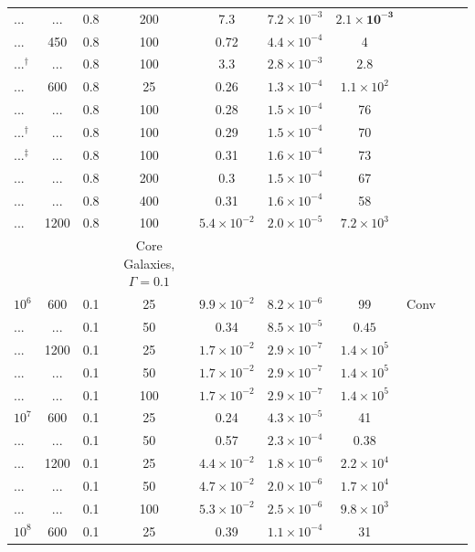 \documentclass[usenatbib,fleqn]{mn2e}
\begin{document}
\begin{table}
\begin{threeparttable}
\begin{minipage}{18cm}
\begin{tabular}{lccccccccc}
... & ... & 0.8 & 200 & 7.3 & $ 7.2 \times 10^{ -3 }$ & $\mathbf{ 2.1
  \times 10^{ -3 }}$ \\
... & 450 & 0.8 & 100 & 0.72 & $ 4.4 \times 10^{ -4 }$ & 4 \\
...$^{\dagger}$ & ... & 0.8 & 100 & 3.3 & $ 2.8 \times 10^{ -3 }$ & $\mathbf{2.8}$\\
... & 600 & 0.8 & 25 & 0.26 & $ 1.3 \times 10^{ -4 }$ & $ 1.1 \times 10^{ 2 }$ \\
... & ... & 0.8 & 100 & 0.28 & $ 1.5 \times 10^{ -4 }$ & 76 \\
...$^{\dagger}$ & ... & 0.8 & 100 & 0.29 & $ 1.5 \times 10^{ -4 }$ &
70 \\
...$^{\ddagger}$ & ... & 0.8 & 100 & 0.31 & $ 1.6 \times 10^{ -4 }$ & 73 \\
... & ... & 0.8 & 200 & 0.3 & $ 1.5 \times 10^{ -4 }$ & 67 \\
... & ... & 0.8 & 400 & 0.31 & $ 1.6 \times 10^{ -4 }$ & 58 \\
... & 1200 & 0.8 & 100 & $ 5.4 \times 10^{ -2 }$ & $ 2.0 \times 10^{
  -5 }$ & $ 7.2 \times 10^{ 3 }$ \\
  \hline
 & & & Core Galaxies, $\Gamma = 0.1$ & & & & & & \\
$    10^{ 6 }$ & 600 & 0.1 & 25 & $ 9.9 \times 10^{ -2 }$ & $ 8.2
\times 10^{ -6 }$ & 99 & Conv\\
... & ... & 0.1 & 50 & 0.34 & $ 8.5 \times 10^{ -5 }$ & $\mathbf{0.45}$ \\
... & 1200 & 0.1 & 25 & $ 1.7 \times 10^{ -2 }$ & $ 2.9 \times 10^{ -7 }$ & $ 1.4 \times 10^{ 5 }$ \\
... & ... & 0.1 & 50 & $ 1.7 \times 10^{ -2 }$ & $ 2.9 \times 10^{ -7 }$ & $ 1.4 \times 10^{ 5 }$ \\
... & ... & 0.1 & 100 & $ 1.7 \times 10^{ -2 }$ & $ 2.9 \times 10^{ -7 }$ & $ 1.4 \times 10^{ 5 }$ \\
$    10^{ 7 }$ & 600 & 0.1 & 25 & 0.24 & $ 4.3 \times 10^{ -5 }$ & 41 \\
... & ... & 0.1 & 50 & 0.57 & $ 2.3 \times 10^{ -4 }$ & $\mathbf{0.38}$ \\
... & 1200 & 0.1 & 25 & $ 4.4 \times 10^{ -2 }$ & $ 1.8 \times 10^{ -6 }$ & $ 2.2 \times 10^{ 4 }$ \\
... & ... & 0.1 & 50 & $ 4.7 \times 10^{ -2 }$ & $ 2.0 \times 10^{ -6 }$ & $ 1.7 \times 10^{ 4 }$ \\
... & ... & 0.1 & 100 & $ 5.3 \times 10^{ -2 }$ & $ 2.5 \times 10^{ -6 }$ & $ 9.8 \times 10^{ 3 }$ \\
$    10^{ 8 }$ & 600 & 0.1 & 25 & 0.39 & $ 1.1 \times 10^{ -4 }$ & 31 \\

\end{tabular}
\end{minipage}
\end{threeparttable}
\end{table}
\end{document}
